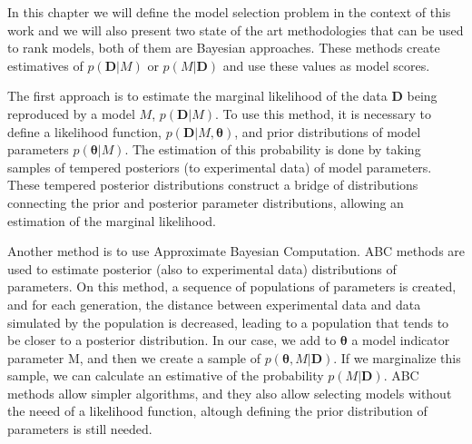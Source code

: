 
In this chapter we will define the model selection problem in the 
context of this work and we will also present two state of the art 
methodologies that can be used to rank models, both of them are Bayesian
approaches. These methods create estimatives of $p ({\bm D} | M)$ or $p
(M | {\bm D})$ and use these values as model scores. 

The first approach is to estimate the marginal likelihood of the data 
${\bm D}$ being reproduced by a model $M$, $p ({\bm D} | M)$. To use
this method, it is necessary to define a likelihood function, $p({\bm D}
| M, {\bm \theta})$, and prior distributions of model parameters $p({\bm
\theta} | M)$. The estimation of this probability is done by taking
samples of tempered posteriors (to experimental data) of model
parameters. These tempered posterior distributions construct a bridge of
distributions connecting the prior and posterior parameter
distributions, allowing an estimation of the marginal likelihood. 

Another method is to use Approximate Bayesian Computation. ABC methods 
are used to estimate posterior (also to experimental data) distributions
of parameters. On this method, a sequence of populations of parameters
is created, and for each generation, the distance between experimental
data and data simulated by the population is decreased, leading to a
population that tends to be closer to a posterior distribution. In our
case, we add to ${\bm \theta}$ a model indicator parameter M, and then
we create a sample of $p({\bm \theta}, M | {\bm D})$. If we marginalize
this sample, we can calculate an estimative of the probability $p (M |
{\bm D})$. ABC methods allow simpler algorithms, and they also allow
selecting models without the neeed of a likelihood function, altough
defining the prior distribution of parameters is still needed.

